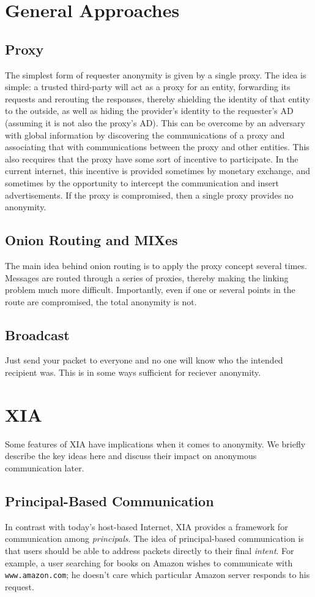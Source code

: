 \documentclass{article}
\begin{document}
\section{General Approaches}
\subsection{Proxy}
The simplest form of requester anonymity is given by a single proxy.  The idea is simple: a trusted third-party will act as a proxy for an entity, forwarding its requests and rerouting the responses, thereby shielding the identity of that entity to the outside, as well as hiding the provider's identity to the requester's AD (assuming it is not also the proxy's AD).  This can be overcome by an adversary with global information by discovering the communications of a proxy and associating that with communications between the proxy and other entities.  This also recquires that the proxy have some sort of incentive to participate.  In the current internet, this incentive is provided sometimes by monetary exchange, and sometimes by the opportunity to intercept the communication and insert advertisements.  If the proxy is compromised, then a single proxy provides no anonymity.
\subsection{Onion Routing and MIXes}
The main idea behind onion routing is to apply the proxy concept several times.  Messages are routed through a series of proxies, thereby making the linking problem much more difficult.  Importantly, even if one or several points in the route are compromised, the total anonymity is not.
\subsection{Broadcast}
Just send your packet to everyone and no one will know who the intended recipient was.  This is in some ways sufficient for reciever anonymity.  


\section{XIA}
\label{sec:xia-overview}
Some features of XIA have implications when it comes to anonymity. We briefly describe the key ideas here and discuss their impact on anonymous communication later.
\subsection{Principal-Based Communication}
In contrast with today's host-based Internet, XIA provides a framework for communication among \emph{principals}. The idea of principal-based communication is that users should be able to address packets directly to their final \emph{intent}. For example, a user searching for books on Amazon wishes to communicate with \texttt{www.amazon.com}; he doesn't care which particular Amazon server responds to his request.
\end{document}

